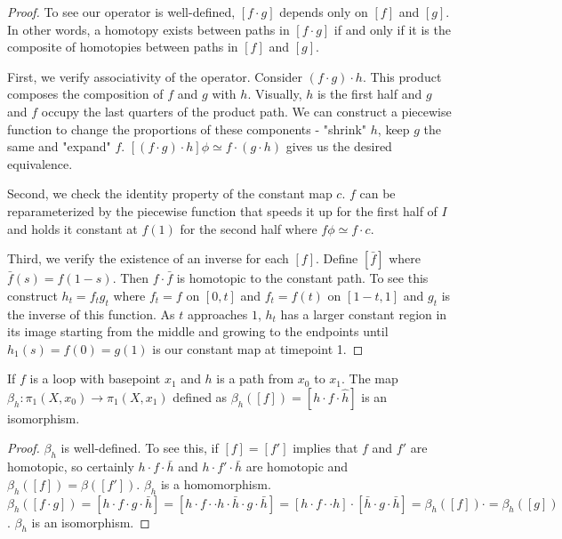 \documentclass[10pt]{article}
\begin{document}
\begin{proof}
	To see our operator is well-defined, $[f\cdot g]$ depends only on $[f]$ and $[g]$. In other words, a homotopy exists between paths in $[f\cdot g]$ if and only if it is the composite of homotopies between paths in $[f]$ and $[g]$.

	First, we verify associativity of the operator. Consider $(f \cdot g) \cdot h$. This product composes the composition of $f$ and $g$ with $h$. Visually, $h$ is the first half and $g$ and $f$ occupy the last quarters of the product path. We can construct a piecewise function to change the proportions of these components - "shrink" $h$, keep $g$ the same and "expand" $f$. $[(f \cdot g) \cdot h]\phi \simeq f \cdot (g \cdot h)$ gives us the desired equivalence.

	Second, we check the identity property of the constant map $c$. $f$ can be reparameterized by the piecewise function that speeds it up for the first half of $I$ and holds it constant at $f(1)$ for the second half where $f\phi \simeq f \cdot c$.

	Third, we verify the existence of an inverse for each $[f]$. Define $[\bar{f}]$ where $\bar{f}(s) = f(1-s)$. Then $f\cdot\bar{f}$ is homotopic to the constant path. To see this construct $h_t = f_tg_t$ where $f_t = f$ on $[0, t]$ and $f_t = f(t)$ on $[1-t, 1]$ and $g_t$ is the inverse of this function. As $t$ approaches $1$, $h_t$ has a larger constant region in its image starting from the middle and growing to the endpoints until $h_1(s) = f(0) = g(1)$ is our constant map at timepoint 1.

\end{proof}

\begin{proposition}
	If $f$ is a loop with basepoint $x_1$ and $h$ is a path from $x_0$ to $x_1$. The map $\beta_h: \pi_1(X, x_0) \to \pi_1(X, x_1)$ defined as $\beta_h([f]) = [h \cdot f \cdot \hat{h}]$ is an isomorphism.
\end{proposition}
\begin{proof}
	$\beta_h$ is well-defined. To see this, if $[f] = [f']$ implies that $f$ and $f'$ are homotopic, so certainly $h \cdot f \cdot \bar{h}$ and $h \cdot f' \cdot \bar{h}$ are homotopic and $\beta_h([f]) = \beta([f'])$.
	$\beta_h$ is a homomorphism. $\beta_h([f \cdot g]) = [h \cdot f \cdot g \cdot \bar{h}] = [h \cdot f \cdot \cdot h \cdot \bar{h} \cdot g \cdot \bar{h}] = [h \cdot f \cdot \cdot h] \cdot [\bar{h} \cdot g \cdot \bar{h}] = \beta_h([f]) \cdot = \beta_h([g])$. 
	$\beta_h$ is an isomorphism.

\end{proof}
\end{document}
